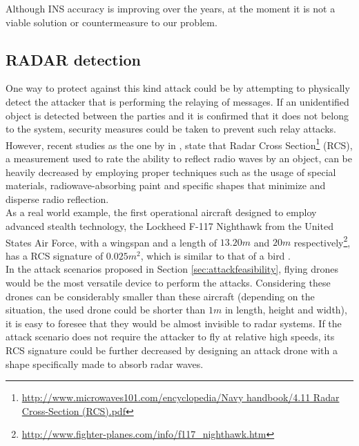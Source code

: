 \documentclass{article}
\begin{document}
Although INS accuracy is improving over the years, at the moment it is not a viable solution or countermeasure to our problem.\\

\subsection{RADAR detection}

One way to protect against this kind attack could be by attempting to physically detect the attacker that is performing the relaying of messages. If an unidentified object is detected between the parties and it is confirmed that it does not belong to the system, security measures could be taken to prevent such relay attacks.\\

However, recent studies as the one by \citeauthor{cadirci2009rf} in \cite{cadirci2009rf}, state that Radar Cross Section\footnote{\url{http://www.microwaves101.com/encyclopedia/Navy handbook/4.11 Radar Cross-Section (RCS).pdf}} (RCS), a measurement used to rate the ability to reflect radio waves by an object, can be heavily decreased by employing proper techniques such as the usage of special materials, radiowave-absorbing paint and specific shapes that minimize and disperse radio reflection.\\

As a real world example, the first operational aircraft designed to employ advanced stealth technology, the Lockheed F-117 Nighthawk from the United States Air Force, with a wingspan and a length of $13.20m$ and $20m$ respectively\footnote{\url{http://www.fighter-planes.com/info/f117_nighthawk.htm}}, has a RCS signature of $0.025m^2$, which is similar to that of a bird \cite{cadirci2009rf}.\\

In the attack scenarios proposed in Section \ref{sec:attackfeasibility}, flying drones would be the most versatile device to perform the attacks. Considering these drones can be considerably smaller than these aircraft (depending on the situation, the used drone could be shorter than $1m$ in length, height and width), it is easy to foresee that they would be almost invisible to radar systems. If the attack scenario does not require the attacker to fly at relative high speeds, its RCS signature could be further decreased by designing an attack drone with a shape specifically made to absorb radar waves.\\
\end{document}

